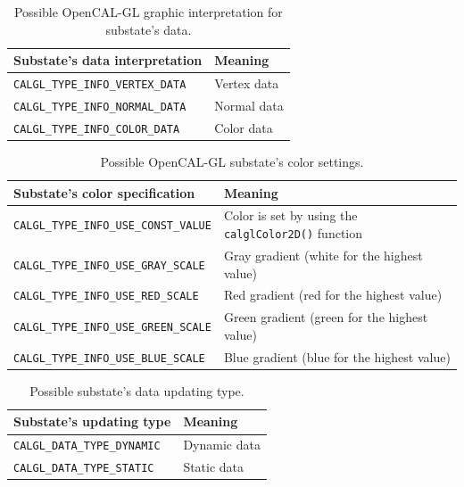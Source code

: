 \begin{table}
  \centering
  \small
  \begin{tabular}{l|l}
    \hline
    Substate's data interpretation & Meaning\\
    \hline
    \hline
    \verb'CALGL_TYPE_INFO_VERTEX_DATA' & Vertex data\\
    \verb'CALGL_TYPE_INFO_NORMAL_DATA' & Normal data\\
    \verb'CALGL_TYPE_INFO_COLOR_DATA'  & Color data\\
    \hline
  \end{tabular}
  \caption{Possible OpenCAL-GL graphic interpretation for substate's data.}
  \label{tab:substate_type_info}
\end{table} 

\begin{table}
  \centering
  \footnotesize
  \begin{tabular}{l|l}
    \hline
    Substate's color specification & Meaning \\
    \hline
    \hline
    \verb'CALGL_TYPE_INFO_USE_CONST_VALUE' & Color is set by using the \verb'calglColor2D()' function\\
    \verb'CALGL_TYPE_INFO_USE_GRAY_SCALE'  & Gray gradient (white for the highest value)\\
    \verb'CALGL_TYPE_INFO_USE_RED_SCALE '  & Red gradient (red for the highest value)\\
    \verb'CALGL_TYPE_INFO_USE_GREEN_SCALE' & Green gradient (green for the highest value)\\
    \verb'CALGL_TYPE_INFO_USE_BLUE_SCALE'  & Blue gradient (blue for the highest value)\\
    \hline
  \end{tabular}
  \caption{Possible OpenCAL-GL substate's color settings.}
  \label{tab:substate_color_info}
\end{table} 

\begin{table}
  \centering
  \small
  \begin{tabular}{l|l}
    \hline
    Substate's updating type & Meaning \\
    \hline
    \hline
    \verb'CALGL_DATA_TYPE_DYNAMIC' & Dynamic data\\
    \verb'CALGL_DATA_TYPE_STATIC'  & Static data\\
    \hline
  \end{tabular}
  \caption{Possible substate's data updating type.}
  \label{tab:substate_updating_type}
\end{table} 

